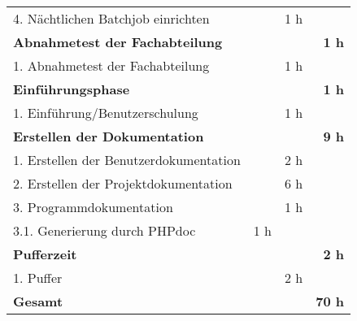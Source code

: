 \begin{tabularx}{\textwidth}{Xrrr}
    \rowcolor{odd}4. Nächtlichen Batchjob einrichten                                 &           & 1 h       &               \\
    \rowcolor{heading}\textbf{Abnahmetest der Fachabteilung}                         & \textbf{} & \textbf{} & \textbf{1 h}  \\
    1. Abnahmetest der Fachabteilung                                                 &           & 1 h       &               \\
    \rowcolor{heading}\textbf{Einführungsphase}                                      & \textbf{} & \textbf{} & \textbf{1 h}  \\
    1. Einführung/Benutzerschulung                                                   &           & 1 h       &               \\
    \rowcolor{heading}\textbf{Erstellen der Dokumentation}                           & \textbf{} & \textbf{} & \textbf{9 h}  \\
    1. Erstellen der Benutzerdokumentation                                           &           & 2 h       &               \\
    \rowcolor{odd}2. Erstellen der Projektdokumentation                              &           & 6 h       &               \\
    3. Programmdokumentation                                                         &           & 1 h       &               \\
    \rowcolor{odd}3.1. Generierung durch PHPdoc                                      & 1 h       &           &               \\
    \rowcolor{heading}\textbf{Pufferzeit}                                            & \textbf{} & \textbf{} & \textbf{2 h}  \\
    1. Puffer                                                                        &           & 2 h       &               \\
    \hline
    \hline
    \rowcolor{heading}\textbf{Gesamt}                                                & \textbf{} & \textbf{} & \textbf{70 h} \\
\end{tabularx}
